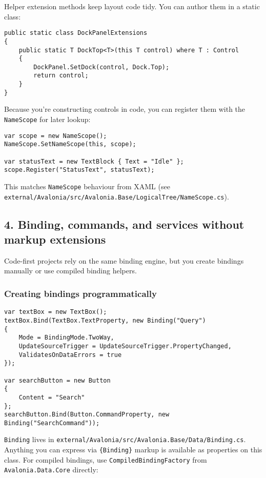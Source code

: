 Helper extension methods keep layout code tidy. You can author them in a
static class:

\begin{lstlisting}
public static class DockPanelExtensions
{
    public static T DockTop<T>(this T control) where T : Control
    {
        DockPanel.SetDock(control, Dock.Top);
        return control;
    }
}
\end{lstlisting}

Because you're constructing controls in code, you can register them with
the \passthrough{\lstinline!NameScope!} for later lookup:

\begin{lstlisting}
var scope = new NameScope();
NameScope.SetNameScope(this, scope);

var statusText = new TextBlock { Text = "Idle" };
scope.Register("StatusText", statusText);
\end{lstlisting}

This matches \passthrough{\lstinline!NameScope!} behaviour from XAML
(see
\passthrough{\lstinline!external/Avalonia/src/Avalonia.Base/LogicalTree/NameScope.cs!}).

\subsection{4. Binding, commands, and services without markup
extensions}\label{binding-commands-and-services-without-markup-extensions}

Code-first projects rely on the same binding engine, but you create
bindings manually or use compiled binding helpers.

\subsubsection{Creating bindings
programmatically}\label{creating-bindings-programmatically}

\begin{lstlisting}
var textBox = new TextBox();
textBox.Bind(TextBox.TextProperty, new Binding("Query")
{
    Mode = BindingMode.TwoWay,
    UpdateSourceTrigger = UpdateSourceTrigger.PropertyChanged,
    ValidatesOnDataErrors = true
});

var searchButton = new Button
{
    Content = "Search"
};
searchButton.Bind(Button.CommandProperty, new Binding("SearchCommand"));
\end{lstlisting}

\passthrough{\lstinline!Binding!} lives in
\passthrough{\lstinline!external/Avalonia/src/Avalonia.Base/Data/Binding.cs!}.
Anything you can express via \passthrough{\lstinline!\{Binding\}!}
markup is available as properties on this class. For compiled bindings,
use \passthrough{\lstinline!CompiledBindingFactory!} from
\passthrough{\lstinline!Avalonia.Data.Core!} directly:

